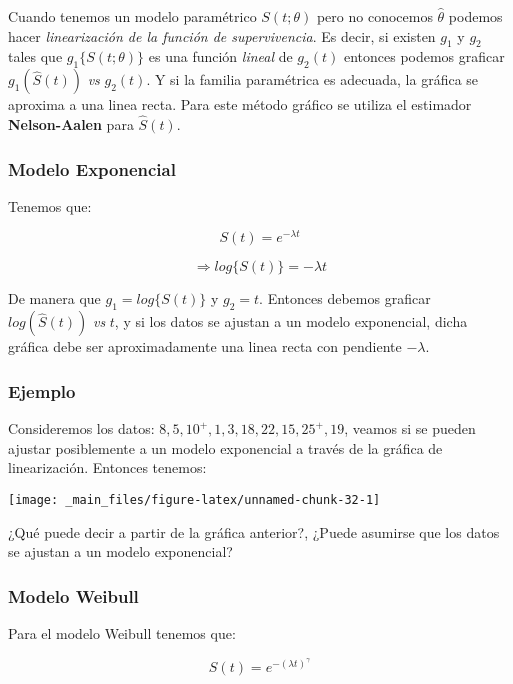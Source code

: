 \documentclass[
  a4paper,
  oneside,
  openany]{book}
\begin{document}
Cuando tenemos un modelo paramétrico \(S(t;\theta)\) pero no conocemos \(\hat{\theta}\) podemos hacer \emph{linearización de la función de supervivencia}. Es decir, si existen \(g_1\) y \(g_2\) tales que \(g_1\{S(t;\theta)\}\) es una función \emph{lineal} de \(g_2(t)\) entonces podemos graficar \(g_1(\hat{S}(t))\) \emph{vs} \(g_2(t)\). Y si la familia paramétrica es adecuada, la gráfica se aproxima a una linea recta. Para este método gráfico se utiliza el estimador \textbf{Nelson-Aalen} para \(\hat S(t)\).

\hypertarget{modelo-exponencial-2}{%
\subsubsection*{Modelo Exponencial}\label{modelo-exponencial-2}}


Tenemos que:

\[
S(t)=e^{-\lambda t}
\]

\[
\Longrightarrow log\{S(t)\}=-\lambda t  
\]

De manera que \(g_1=log\{S(t)\}\) y \(g_2=t\). Entonces debemos graficar \(log(\hat S(t))\) \emph{vs} \(t\), y si los datos se ajustan a un modelo exponencial, dicha gráfica debe ser aproximadamente una linea recta con pendiente \(-\lambda\).

\hypertarget{ejemplo-14}{%
\subsubsection*{Ejemplo}\label{ejemplo-14}}


Consideremos los datos: \(8,5,10^+,1,3,18,22,15,25^+,19\), veamos si se pueden ajustar posiblemente a un modelo exponencial a través de la gráfica de linearización. Entonces tenemos:

\begin{center}\texttt{[image: \_main\_files/figure-latex/unnamed-chunk-32-1]} \end{center}

¿Qué puede decir a partir de la gráfica anterior?, ¿Puede asumirse que los datos se ajustan a un modelo exponencial?

\hypertarget{modelo-weibull-2}{%
\subsubsection*{Modelo Weibull}\label{modelo-weibull-2}}


Para el modelo Weibull tenemos que:

\[
S(t)=e^{-(\lambda t)^{\gamma}}
\]
\end{document}
